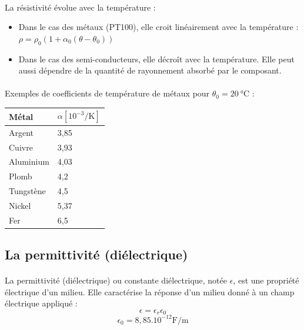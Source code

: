 \documentclass{article}
\begin{document}
\paragraph{}
La résistivité évolue avec la température :
\begin{itemize}
    \item Dans le cas des métaux (PT100), elle croit linéairement avec la température : $\rho = \rho_0\left(1 + \alpha_0\left(\theta - \theta_0\right)\right)$
    \item Dans le cas des semi-conducteurs, elle décroît avec la température. Elle peut aussi dépendre de la quantité de rayonnement absorbé par le composant.
\end{itemize}

\paragraph{}Exemples de coefficients de température de métaux pour $\theta_0 = \SI{20}{\celsius}$ :
\begin{table}[H]
    \centering
    \begin{tabular}{l l}
        \textbf{Métal} & \textbf{$\alpha [10^{-3}\si{\per\kelvin}]$}\\
        \hline
        Argent & 3,85\\
        Cuivre & 3,93\\
        Aluminium & 4,03\\
        Plomb & 4,2\\
        Tungstène & 4,5\\
        Nickel & 5,37\\
        Fer & 6,5\\
    \end{tabular}
\end{table}

\subsection{La permittivité (diélectrique)}
\paragraph{}
La permittivité (diélectrique) ou constante diélectrique, notée $\epsilon$, est une propriété électrique d'un milieu. Elle caractérise la réponse d'un milieu donné à un champ électrique appliqué :
$$\epsilon = \epsilon_r \epsilon_0$$
$$\epsilon_0 = 8,85.10^{-12} \si{\farad\per\meter}$$
\end{document}
